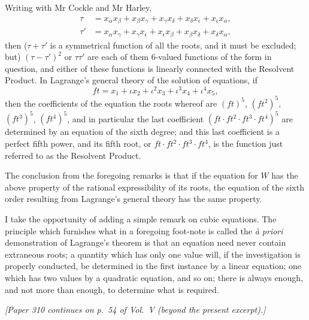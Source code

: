 \documentclass[11pt,a4paper]{article}
\begin{document}
Writing with Mr Cockle and Mr Harley,
\begin{align*}
\tau &= x_\alpha x_\beta+x_\beta x_\gamma+x_\gamma x_\delta+x_\delta x_\epsilon+x_\epsilon x_\alpha,\\
\tau' &= x_\alpha x_\gamma+x_\gamma x_\epsilon+x_\epsilon x_\beta+x_\beta x_\delta+x_\delta x_\alpha,
\end{align*}
then ($\tau+\tau'$ is a symmetrical function of all the roots, and it must be excluded; but) $(\tau-\tau')^2$ or $\tau\tau'$ are each of them 6-valued functions of the form in question, and either of these functions is linearly connected with the Resolvent Product. In Lagrange's general theory of the solution of equations, if
\[
ft=x_1+\iota x_2+\iota^2 x_3+\iota^3 x_4+\iota^4 x_5,
\]
then the coefficients of the equation the roots whereof are $(ft)^5$, $(ft^2)^5$, $(ft^3)^5$, $(ft^4)^5$, and in particular the last coefficient $(ft\cdot ft^2\cdot ft^3\cdot ft^4)^5$ are determined by an equation of the sixth degree; and this last coefficient is a perfect fifth power, and its fifth root, or $ft\cdot ft^2\cdot ft^3\cdot ft^4$, is the function just referred to as the Resolvent Product.

The conclusion from the foregoing remarks is that if the equation for $W$ has the above property of the rational expressibility of its roots, the equation of the sixth order resulting from Lagrange's general theory has the same property.

I take the opportunity of adding a simple remark on cubic equations. The principle which furnishes what in a foregoing foot-note is called the \textit{\`{a} priori} demonstration of Lagrange's theorem is that an equation need never contain extraneous roots; a quantity which has only one value will, if the investigation is properly conducted, be determined in the first instance by a linear equation; one which has two values by a quadratic equation, and so on; there is always enough, and not more than enough, to determine what is required.

\medskip

\noindent\textit{[Paper 310 continues on p.\ 54 of Vol.\ V (beyond the present excerpt).]}
\end{document}
